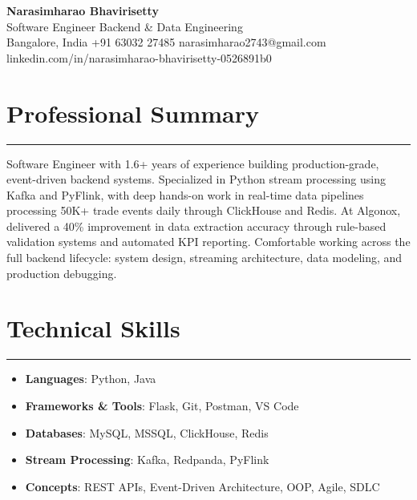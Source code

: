 \documentclass[10pt]{article}
\begin{document}
\begin{center}
  {\huge\textbf{Narasimharao Bhavirisetty}}\\[3pt]
  Software Engineer \textbullet{} Backend \& Data Engineering \\[3pt]
  Bangalore, India \textbullet{} +91 63032 27485 \textbullet{} narasimharao2743@gmail.com \textbullet{} linkedin.com/in/narasimharao-bhavirisetty-0526891b0
\end{center}

\vspace{6pt}

\section*{Professional Summary}
\vspace{1pt}\hrule\vspace{4pt}
Software Engineer with 1.6+ years of experience building production-grade, event-driven backend systems. Specialized in Python stream processing using Kafka and PyFlink, with deep hands-on work in real-time data pipelines processing 50K+ trade events daily through ClickHouse and Redis. At Algonox, delivered a 40\% improvement in data extraction accuracy through rule-based validation systems and automated KPI reporting. Comfortable working across the full backend lifecycle: system design, streaming architecture, data modeling, and production debugging.

\section*{Technical Skills}
\vspace{1pt}\hrule\vspace{4pt}
\begin{itemize}
  \item \textbf{Languages}: Python, Java
  \item \textbf{Frameworks \& Tools}: Flask, Git, Postman, VS Code
  \item \textbf{Databases}: MySQL, MSSQL, ClickHouse, Redis
  \item \textbf{Stream Processing}: Kafka, Redpanda, PyFlink
  \item \textbf{Concepts}: REST APIs, Event-Driven Architecture, OOP, Agile, SDLC
\end{itemize}
\end{document}
